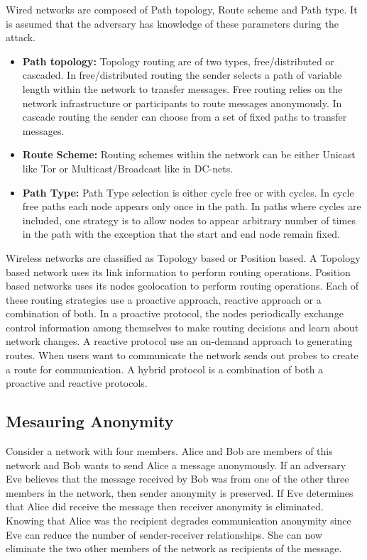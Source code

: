 \documentclass{llncs}
\begin{document}
Wired networks are composed of Path topology, Route scheme and Path type. It is assumed that the adversary has knowledge of these parameters during the attack. 
\begin{itemize}
	\item[]{\textbf{Path topology:} Topology routing are of two types, free/distributed or cascaded. In free/distributed routing the sender selects a path of variable length within the network to transfer messages. Free routing relies on the network infrastructure or participants to route messages anonymously. In cascade routing the sender can choose from a set of fixed paths to transfer messages.}
	\item[]{\textbf{Route Scheme:} Routing schemes within the network can be either Unicast like Tor or Multicast/Broadcast like in DC-nets. }
	\item[]{\textbf{Path Type:} Path Type selection is either cycle free or with cycles. In cycle free paths each node appears only once in the path. In paths where cycles are included, one strategy is to allow nodes to appear arbitrary number of times in the path with the exception that the start and end node remain fixed.}
\end{itemize}

Wireless networks are classified as Topology based or Position based. A Topology based network uses its link information to perform routing operations. Position based networks uses its nodes geolocation to perform routing operations. Each of these routing strategies use a proactive approach, reactive approach or a combination of both. In a proactive protocol, the nodes periodically exchange control information among themselves to make routing decisions and learn about network changes. A reactive protocol use an on-demand approach to generating routes. When users want to communicate the network sends out probes to create a route for communication. A hybrid protocol is a combination of both a proactive and reactive protocols.

\subsection{Mesauring Anonymity}
Consider a network with four members. Alice and Bob are members of this network and Bob wants to send Alice a message anonymously. If an adversary Eve believes that the message received by Bob was from one of the other three members in the network, then sender anonymity is preserved. If Eve determines that Alice did receive the message then receiver anonymity is eliminated. Knowing that Alice was the recipient degrades communication anonymity since Eve can reduce the number of sender-receiver relationships. She can now eliminate the two other members of the network as recipients of the message.
\end{document}
